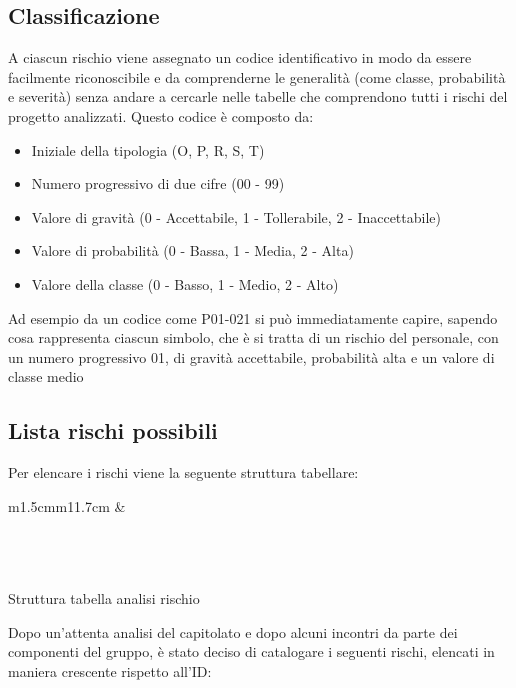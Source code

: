	\subsection{Classificazione}
	A ciascun rischio viene assegnato un codice identificativo in modo da essere facilmente riconoscibile e da comprenderne le generalità (come classe, probabilità e severità) senza andare a cercarle nelle tabelle che comprendono tutti i rischi del progetto analizzati.
	Questo codice è composto da:
	\begin{itemize}
		\item Iniziale della tipologia (O, P, R, S, T)
		\item Numero progressivo di due cifre (00 - 99)
		\item Valore di gravità (0 - Accettabile, 1 - Tollerabile, 2 - Inaccettabile)
		\item Valore di probabilità (0 - Bassa, 1 - Media, 2 - Alta)
		\item Valore della classe (0 - Basso, 1 - Medio, 2 - Alto)
	\end{itemize}
	Ad esempio da un codice come P01-021 si può immediatamente capire, sapendo cosa rappresenta ciascun simbolo, che è si tratta di un rischio del personale, con un numero progressivo 01, di gravità accettabile, probabilità alta e un valore di classe medio
	
	\subsection{Lista rischi possibili}
	Per elencare i rischi viene la seguente struttura tabellare:
	\begin{table}[H]
		\begin{risktable}{\columnwidth}{m{1.5cm}m{11.7cm}}
			 & 
			\\
			\hline
			\\
			\hline
			\\
			\hline
			\\
		\end{risktable}
		\caption{Struttura tabella analisi rischio}
	\end{table}

	\noindent
	Dopo un'attenta analisi del capitolato e dopo alcuni incontri da parte dei componenti del gruppo, è stato deciso di catalogare i seguenti rischi, elencati in maniera crescente rispetto all'ID:\\
	
